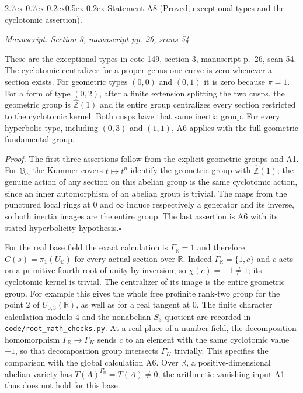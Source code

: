 \documentclass[11pt,a4paper]{article}
\makeatletter
\newcommand{\passage}[1]{\par\smallskip\noindent\textit{Manuscript: #1}\par\smallskip}
\renewcommand\paragraph{\@startsection{paragraph}{4}{\z@}%
  {2.7ex \@plus 0.7ex \@minus 0.2ex}{0.5ex \@plus 0.2ex}%
  {\normalfont\normalsize\bfseries}}
\makeatother
\begin{document}
\paragraph{Statement A8 (Proved; exceptional types and the cyclotomic assertion).}\label{res:A8}
\passage{Section 3, manuscript pp. 26, scans 54}

These are the exceptional types in cote 149, section 3, manuscript p.~26, scan 54.
The cyclotomic centralizer for a proper genus-one curve is zero whenever a section exists. For geometric types $(0,0)$ and $(0,1)$ it is zero because $\pi=1$. For a form of type $(0,2)$, after a finite extension splitting the two cusps, the geometric group is $\widehat{\mathbb Z}(1)$ and its entire group centralizes every section restricted to the cyclotomic kernel. Both cusps have that same inertia group. For every hyperbolic type, including $(0,3)$ and $(1,1)$, A6 applies with the full geometric fundamental group.

\emph{Proof.} The first three assertions follow from the explicit geometric groups and A1. For $\mathbb G_m$ the Kummer covers $t\mapsto t^n$ identify the geometric group with $\widehat{\mathbb Z}(1)$; the genuine action of any section on this abelian group is the same cyclotomic action, since an inner automorphism of an abelian group is trivial. The maps from the punctured local rings at $0$ and $\infty$ induce respectively a generator and its inverse, so both inertia images are the entire group. The last assertion is A6 with its stated hyperbolicity hypothesis.\hfill$\square$

For the real base field the exact calculation is
$\Gamma_{\mathbb R}^{\circ}=1$ and therefore
$C(s)=\pi_1(U_{\mathbb C})$ for every actual section over $\mathbb R$.
Indeed $\Gamma_{\mathbb R}=\{1,c\}$ and $c$ acts on a primitive fourth
root of unity by inversion, so $\chi(c)=-1\ne1$; its cyclotomic kernel
is trivial. The centralizer of its image is the entire geometric group.
For example this gives the whole free profinite rank-two group for
the point $2$ of $U_{0,3}(\mathbb R)$, as well as for a real tangent at
$0$. The finite character calculation modulo $4$ and the nonabelian
$S_3$ quotient are recorded in \texttt{code/root\_math\_checks.py}.
At a real place of a number field, the decomposition homomorphism
$\Gamma_{\mathbb R}\to\Gamma_K$ sends $c$ to an element with the same
cyclotomic value $-1$, so that decomposition group intersects
$\Gamma_K^\circ$ trivially. This specifies the comparison with the
global calculation A6. Over $\mathbb R$, a positive-dimensional
abelian variety has $T(A)^{\Gamma_{\mathbb R}^\circ}=T(A)\ne0$;
the arithmetic vanishing input A1 thus does not hold for this base.
\end{document}
